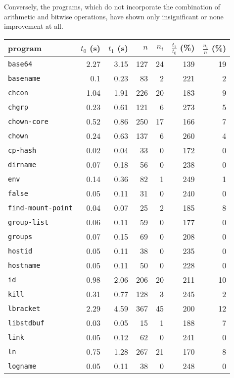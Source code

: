 \documentclass[12pt,oneside]{fithesis2}
\theoremstyle{definition}
\begin{document}
Conversely, the programs, which do not incorporate the combination of arithmetic and bitwise operations, have shown only insignificant or none improvement at all.

\begin{table}[ht!]
  \scriptsize
  \centering
  \begin{tabular}{l rrrr | rr}
    program & $t_0$ (s) & $t_1$ (s) & $n$ & $n_i$ & $\frac{t_1}{t_0}$ (\%) & $\frac{n_i}{n}$ (\%) \\
    \midrule

    \texttt{base64} & 2.27 & 3.15 & 127 & 24 & 139 & 19 \\
    \texttt{basename} & 0.1 & 0.23 & 83 & 2 & 221 & 2 \\
    \texttt{chcon} & 1.04 & 1.91 & 226 & 20 & 183 & 9 \\
    \texttt{chgrp} & 0.23 & 0.61 & 121 & 6 & 273 & 5 \\
    \texttt{chown-core} & 0.52 & 0.86 & 250 & 17 & 166 & 7 \\
    \texttt{chown} & 0.24 & 0.63 & 137 & 6 & 260 & 4 \\
    \texttt{cp-hash} & 0.02 & 0.04 & 33 & 0 & 172 & 0 \\
    \texttt{dirname} & 0.07 & 0.18 & 56 & 0 & 238 & 0 \\
    \texttt{env} & 0.14 & 0.36 & 82 & 1 & 249 & 1 \\
    \texttt{false} & 0.05 & 0.11 & 31 & 0 & 240 & 0 \\
    \texttt{find-mount-point} & 0.04 & 0.07 & 25 & 2 & 185 & 8 \\
    \texttt{group-list} & 0.06 & 0.11 & 59 & 0 & 177 & 0 \\
    \texttt{groups} & 0.07 & 0.15 & 69 & 0 & 208 & 0 \\
    \texttt{hostid} & 0.05 & 0.11 & 38 & 0 & 235 & 0 \\
    \texttt{hostname} & 0.05 & 0.11 & 50 & 0 & 228 & 0 \\
    \texttt{id} & 0.98 & 2.06 & 206 & 20 & 211 & 10 \\
    \texttt{kill} & 0.31 & 0.77 & 128 & 3 & 245 & 2 \\
    \texttt{lbracket} & 2.29 & 4.59 & 367 & 45 & 200 & 12 \\
    \texttt{libstdbuf} & 0.03 & 0.05 & 15 & 1 & 188 & 7 \\
    \texttt{link} & 0.05 & 0.12 & 62 & 0 & 241 & 0 \\
    \texttt{ln} & 0.75 & 1.28 & 267 & 21 & 170 & 8 \\
    \texttt{logname} & 0.05 & 0.11 & 38 & 0 & 248 & 0 \\

\end{tabular}
\end{table}
\end{document}
